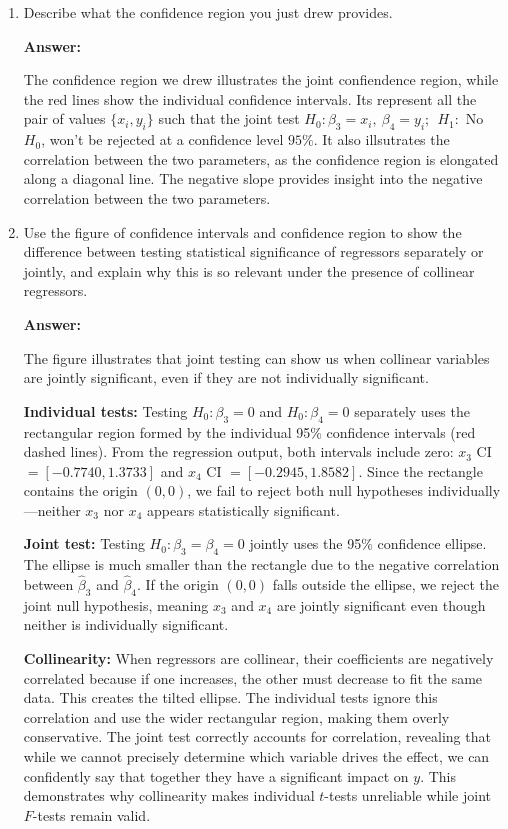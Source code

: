 \documentclass[12pt,a4paper]{article}
\begin{document}
\begin{enumerate}[label=(\roman*)]
  \item Describe what the confidence region you just drew provides.
  
  \textbf{Answer:} 

  The confidence region we drew illustrates the joint confiendence region, while the red lines show the individual confidence intervals.
  Its represent all the pair of values $\{x_i, y_i\}$ such that the joint test $H_0 : \beta_3 = x_i , \: \beta_4 = y_i;\:\: H_1 : $ No $H_0$, won't be rejected at a confidence level $95\%$.
  It also illsutrates the correlation between the two parameters, as the confidence region is elongated along a diagonal line. The negative slope provides 
  insight into the negative correlation between the two parameters.
  
  \item Use the figure of confidence intervals and confidence region to show the difference between testing statistical significance of regressors separately or jointly, and explain why this is so relevant under the presence of collinear regressors.
  
  \textbf{Answer:} 

The figure illustrates that joint testing can show us when collinear variables are jointly significant,
even if they are not individually significant.

\textbf{Individual tests:} Testing $H_0: \beta_3=0$ and 
$H_0: \beta_4=0$ separately uses the rectangular region formed by the 
individual 95\% confidence intervals (red dashed lines). From the regression output,
both intervals include zero: $x_3$ CI 
$= [-0.7740, 1.3733]$ and $x_4$ CI $= [-0.2945, 1.8582]$. Since the 
rectangle contains the origin $(0,0)$, we fail to reject both null 
hypotheses individually---neither $x_3$ nor $x_4$ appears statistically 
significant.

\textbf{Joint test:} Testing $H_0: \beta_3=\beta_4=0$ jointly uses the 
95\% confidence ellipse. The ellipse is much smaller than the rectangle 
due to the negative correlation between $\hat{\beta}_3$ and 
$\hat{\beta}_4$. If the origin $(0,0)$ falls outside the ellipse, we 
reject the joint null hypothesis, meaning $x_3$ and $x_4$ are jointly 
significant even though neither is individually significant.

\textbf{Collinearity:} When regressors are collinear, their 
coefficients are negatively correlated because if one increases, the other
must decrease to fit the same 
data. This creates the tilted ellipse. The individual tests ignore this 
correlation and use the wider rectangular region, making them overly 
conservative. The joint test correctly accounts for correlation, 
revealing that while we cannot precisely determine which variable drives 
the effect, we can confidently say that together they have a significant 
impact on $y$. This demonstrates why collinearity makes individual 
$t$-tests unreliable while joint $F$-tests remain valid.


\end{enumerate}
\end{document}
